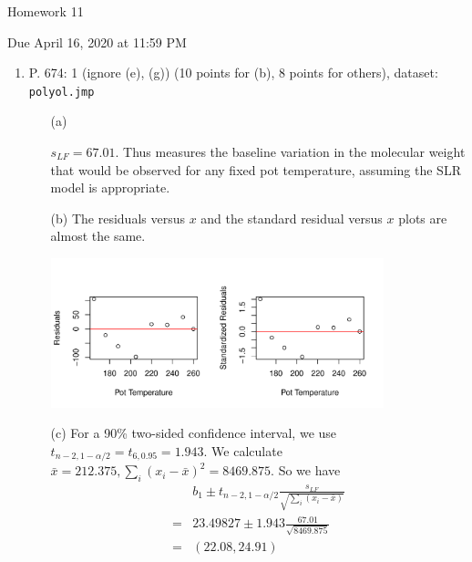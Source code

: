 \documentclass{article}\usepackage[]{graphicx}\usepackage[]{color}
\newenvironment{knitrout}{}{} %
\begin{document}
\begin{center} \LARGE
Homework 11
\end{center}
\begin{center} \Large
Due April 16, 2020 at 11:59 PM 
\end{center}



\begin{enumerate}
	\item P. 674: 1 (ignore (e), (g)) (10 points for (b), 8 points for others), dataset: {\tt polyol.jmp} 
	
	\begin{itemize}
	\item[(a)]
	

  
  
  $s_{LF} = 67.01$. Thus measures the baseline variation in the molecular weight that would be observed for any fixed pot temperature, assuming the SLR model is appropriate.
  
  \item[(b)] The residuals versus $x$ and the standard residual versus $x$ plots are almost the same. 
  
\begin{knitrout}
\color{fgcolor}

{\centering \includegraphics[width=0.8\textwidth]{figure/unnamed-chunk-3-1} 

}



\end{knitrout}
  
  \item[(c)]
  For a 90\% two-sided confidence interval, we use $t_{n-2, 1 - \alpha/2} = t_{6, 0.95} = 1.943$. We calculate $\bar{x} = 212.375, \sum_{i}(x_i - \bar{x})^2 = 8469.875$. So we have
  \begin{align*}
  &b_1 \pm t_{n-2, 1 - \alpha/2} \frac{s_{LF}}{\sqrt{\sum_{i} (x_i - \bar{x})}}\\
  = & 23.49827 \pm 1.943 \frac{67.01}{\sqrt{8469.875}}\\
   =& (22.08, 24.91)
  \end{align*}
  

\end{itemize}
\end{enumerate}
\end{document}

